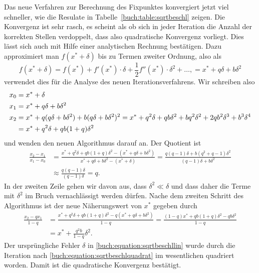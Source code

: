 Das neue Verfahren zur Berechnung des Fixpunktes konvergiert jetzt
viel schneller, wie die Resulate in Tabelle~\ref{buch:table:sqrtbeschl}
zeigen.
%
Die Konvergenz ist sehr rasch, es scheint als ob sich in jeder
Iteration die Anzahl der korrekten Stellen verdoppelt, dass also
quadratische Konvergenz vorliegt.
Dies lässt sich auch mit Hilfe einer analytischen Rechnung
bestätigen.
Dazu approximiert man $f(x^*+\delta)$ bis zu Termen zweiter Ordnung,
also als
\[
f(x^*+\delta)
=
f(x^*) + f'(x^*)\cdot \delta + \frac12f''(x^*)\cdot \delta^2+ \dots,
=
x^* + q\delta + b\delta^2
\]
verwendet dies für die Analyse des neuen Iterationsverfahrens.
Wir schreiben also
\begin{align}
x_0
&=
x^* + \delta
\label{buch:equation:sqrtbeschllin}
\\
x_1
&=
x^* + q\delta + b\delta^2
\notag
\\
x_2
&=
x^* + q(q\delta+b\delta^2) + b(q\delta+b\delta^2)^2
     = x^* + q^2 \delta + qb\delta^2 + bq^2\delta^2
	+ 2qb^2\delta^3 + b^3\delta^4
\notag
\\
&=
x^* + q^2\delta + qb(1+q)\delta^2
\notag
\end{align}
und wenden den neuen Algorithmus darauf an.
Der Quotient ist
\begin{align*}
\frac{x_2-x_1}{x_1-x_0}
&=
\frac{x^* + q^2\delta + qb(1+q)\delta^2 - 
(x^* + q\delta + b\delta^2)}{
x^* + q\delta + b\delta^2
-
(x^* + \delta)
}
=
\frac{
q(q-1)\delta + b(q^2+q -1) \delta^2
}{
(q-1)\delta + b\delta^2
}
\\
&\approx
\frac{q(q-1)\delta}{(q-1)\delta}
=
q.
\end{align*}
In der zweiten Zeile gehen wir davon aus, dass $\delta^2 \ll \delta$ und
dass daher die Terme mit $\delta^2$ im Bruch vernachlässigt werden dürfen.
Nache dem zweiten Schritt des Algorithmus ist der neue Näherungswert
von $x^*$ gegeben durch
\begin{align}
\frac{x_2-qx_1}{1-q}
&=
\frac{
x^* + q^2\delta + qb(1+q)\delta^2
-q(
x^* + q\delta + b\delta^2
)
}{
1-q
}
=
\frac{ (1-q)x^* + qb(1+q)\delta^2 - qb\delta^2 }{1-q}
\label{buch:equation:sqrtnext}
\\
&=
x^* + \frac{q^2b}{1-q}\delta^2.
\label{buch:equation:sqrtbeschlquadrat}
\end{align}
Der ursprüngliche Fehler $\delta$ in 
\eqref{buch:equation:sqrtbeschllin}
wurde
durch die Iteration
nach
\eqref{buch:equation:sqrtbeschlquadrat}
im wesentlichen quadriert worden.
Damit ist die quadratische Konvergenz bestätigt.

